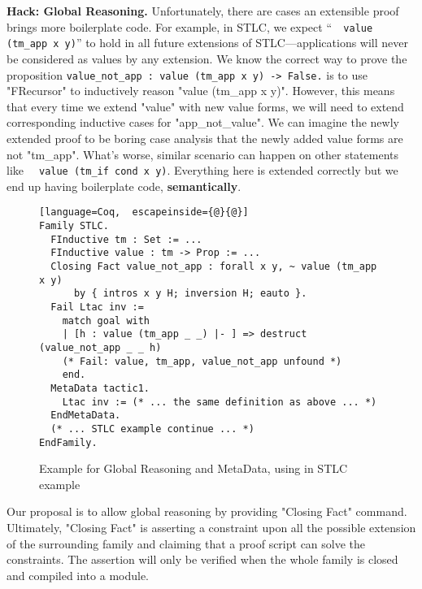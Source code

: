 \textbf{Hack: Global Reasoning.}
Unfortunately, there are cases an extensible proof brings more boilerplate code. For example, in STLC, we expect
``\texttt{~ value (tm_app x y)}'' to hold in all future
extensions of STLC---applications will never be considered as values
by any extension.
We know the correct way to prove the proposition
\texttt{value_not_app : value (tm_app x y) -> False.} is to use
"FRecursor" to inductively reason "value (tm_app x y)". However, this
means that every time we extend "value" with new value forms, we will
need to extend corresponding inductive cases for "app_not_value". We can
imagine the newly extended proof to be boring case analysis that the
newly added value forms are not "tm_app". What's worse, similar
scenario can happen on other statements like \texttt{~ value
(tm_if cond x y)}. Everything here is extended correctly but we end up
having boilerplate code, \textbf{semantically}.
\begin{figure}[!htb]
\begin{lstlisting}[language=Coq,  escapeinside={@}{@}]
Family STLC.
  FInductive tm : Set := ... 
  FInductive value : tm -> Prop := ... 
  Closing Fact value_not_app : forall x y, ~ value (tm_app x y) 
      by { intros x y H; inversion H; eauto }.
  Fail Ltac inv := 
    match goal with 
    | [h : value (tm_app _ _) |- ] => destruct (value_not_app _ _ h)
    (* Fail: value, tm_app, value_not_app unfound *)
    end. 
  MetaData tactic1.
    Ltac inv := (* ... the same definition as above ... *)
  EndMetaData.
  (* ... STLC example continue ... *)
EndFamily.
\end{lstlisting}  
\caption{Example for Global Reasoning and MetaData, using in STLC example}\label{fig:plugin-example-global-reasoning-meta-data}
\end{figure}


Our proposal is to allow global reasoning by providing "Closing Fact" command. Ultimately, "Closing Fact" is asserting a constraint upon all the
possible extension of the surrounding family and claiming that a proof script
can solve the constraints.
The assertion will only be verified when the whole family is closed and compiled into a module.

